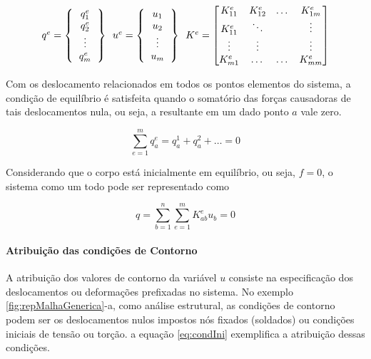  \begin{equation}
 	\label{eq:assembly}
 	\begin{tabular}{c c c}
 	$q^e = 
		\left \{
 		\begin{tabular}{c}
	 		$q^e_1$ \\
	 		$q^e_2$ \\
	 		\vdots \\
	 		$q^e_m$
  		\end{tabular} 		
		\right \}$
		\
 	$u^e = 
		\left \{
 		\begin{tabular}{c}
	 		$u_1$ \\
	 		$u_2$ \\
	 		\vdots \\
	 		$u_m$
  		\end{tabular} 		
		\right \}	$
		\
		$K^e =
		\begin{bmatrix}
		    K^e_{11} 	& K^e_{12}  & \dots 	& K^e_{1m} \\
		    K^e_{11} 	& \ddots  & \ 	& \vdots \\
		    \vdots 	& \vdots  	 & \ 	& \vdots \\
		    K^e_{m1} 	& \dots   & \dots 	& K^e_{mm} 
		\end{bmatrix}	 $		
	\end{tabular} 
 \end{equation}
 
 Com os deslocamento relacionados em todos os pontos elementos do sistema,
 a condição de equilíbrio é satisfeita quando o somatório das forças causadoras de tais deslocamentos nula, ou seja, a resultante em um dado ponto $a$ vale zero.
 
  \begin{equation}
  	\label{eq:somaForcas}
 	\sum_{e=1}^{m}{q_a^e = q_a^1 + q_a^2 + \dots = 0}
  \end{equation}
  
  Considerando que o corpo está inicialmente em equilíbrio, ou seja, $f = 0$, o sistema como um todo pode ser representado como 
  
    \begin{equation}
    	\label{eq:equilibrio}
    	q =
   		\sum_{b=1}^{n}\sum_{e=1}^{m}{K_{ab}^e u_b = 0}
    \end{equation}
    
    
\paragraph{Atribuição das condições de Contorno \\}
A atribuição dos valores de contorno da variável $u$ consiste na especificação dos deslocamentos ou deformações prefixadas no sistema. No exemplo \ref{fig:repMalhaGenerica}-a, como análise estrutural, as condições de contorno podem ser os deslocamentos nulos impostos nós fixados (soldados) ou condições iniciais de tensão ou torção. a equação \ref{eq:condIni} exemplifica a atribuição dessas condições.

